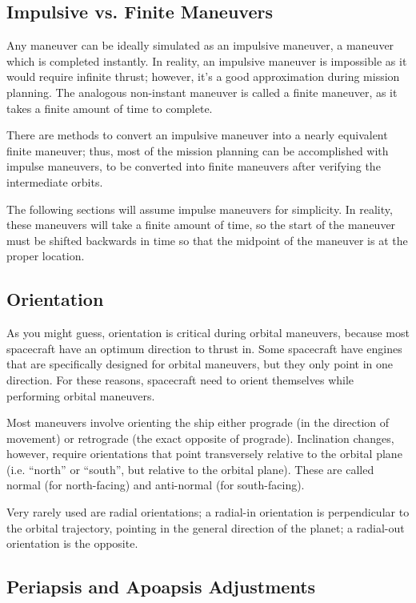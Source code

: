 \documentclass[oneside,a5paper]{book}
\begin{document}
\subsection{Impulsive vs. Finite Maneuvers}

Any maneuver can be ideally simulated as an impulsive maneuver, a
maneuver which is completed instantly. In reality, an impulsive
maneuver is impossible as it would require infinite thrust; however,
it’s a good approximation during mission planning. The analogous
non-instant maneuver is called a finite maneuver, as it takes a finite
amount of time to complete.

There are methods to convert an impulsive maneuver into a nearly
equivalent finite maneuver; thus, most of the mission planning can be
accomplished with impulse maneuvers, to be converted into finite
maneuvers after verifying the intermediate orbits.

The following sections will assume impulse maneuvers for
simplicity. In reality, these maneuvers will take a finite amount of
time, so the start of the maneuver must be shifted backwards in time
so that the midpoint of the maneuver is at the proper location.

\subsection{Orientation}

As you might guess, orientation is critical during orbital maneuvers,
because most spacecraft have an optimum direction to thrust in. Some
spacecraft have engines that are specifically designed for orbital
maneuvers, but they only point in one direction. For these reasons,
spacecraft need to orient themselves while performing orbital
maneuvers.

Most maneuvers involve orienting the ship either prograde (in the
direction of movement) or retrograde (the exact opposite of
prograde). Inclination changes, however, require orientations that
point transversely relative to the orbital plane (i.e. ``north'' or
``south'', but relative to the orbital plane). These are called normal
(for north-facing) and anti-normal (for south-facing).

Very rarely used are radial orientations; a radial-in orientation is
perpendicular to the orbital trajectory, pointing in the general
direction of the planet; a radial-out orientation is the opposite.

\subsection{Periapsis and Apoapsis Adjustments}
\end{document}
